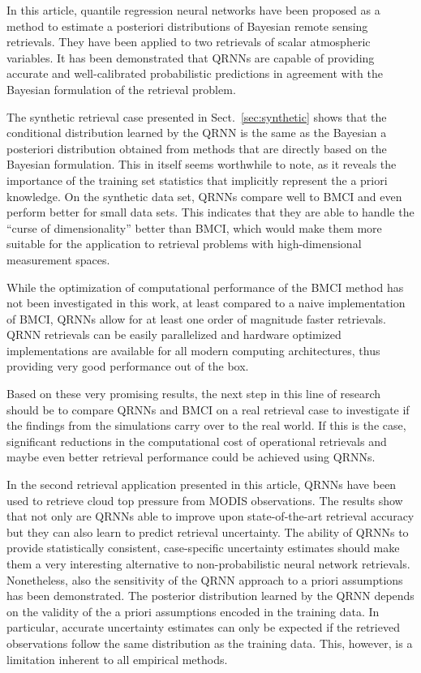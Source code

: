 \documentclass[journal abbreviation, manuscript]{copernicus}
\begin{document}
\conclusions  %
\label{sec:conclusions}

In this article, quantile regression neural networks have been proposed as a
method to estimate a posteriori distributions of Bayesian remote sensing retrievals.
They have been applied to two retrievals of scalar atmospheric variables. It has
been demonstrated that QRNNs are capable of providing accurate and
well-calibrated probabilistic predictions in agreement with the Bayesian
formulation of the retrieval problem.

The synthetic retrieval case presented in Sect.~\ref{sec:synthetic} shows that
the conditional distribution learned by the QRNN is the same as the Bayesian a
posteriori distribution obtained from methods that are directly based on the
Bayesian formulation. This in itself seems worthwhile to note, as it reveals the
importance of the training set statistics that implicitly represent the a priori
knowledge. On the synthetic data set, QRNNs compare well to BMCI and even perform
better for small data sets. This indicates that they are able to handle the
``curse of dimensionality'' \citep{friedman} better than BMCI, which would make them more suitable
for the application to retrieval problems with high-dimensional measurement
spaces.

While the optimization of computational performance of the BMCI method has not been
investigated in this work, at least compared to a naive implementation of BMCI,
QRNNs allow for at least one order of magnitude faster retrievals. QRNN retrievals
can be easily parallelized and hardware optimized implementations are available
for all modern computing architectures, thus providing very good performance out
of the box.

Based on these very promising results, the next step in this line of research
should be to compare QRNNs and BMCI on a real retrieval case to investigate if
the findings from the simulations carry over to the real world. If this is the
case, significant reductions in the computational cost of operational retrievals
and maybe even better retrieval performance could be achieved using QRNNs.

In the second retrieval application presented in this article, QRNNs have been
used to retrieve cloud top pressure from MODIS observations. The results show
that not only are QRNNs able to improve upon state-of-the-art retrieval accuracy
but they can also learn to predict retrieval uncertainty. The ability of QRNNs
to provide statistically consistent, case-specific uncertainty estimates should
make them a very interesting alternative to non-probabilistic neural network
retrievals. Nonetheless, also the sensitivity of the QRNN approach to a priori
assumptions has been demonstrated. The posterior distribution learned by the
QRNN depends on the validity of the a priori assumptions encoded in the training
data. In particular, accurate uncertainty estimates can only be expected if the
retrieved observations follow the same distribution as the training data. This,
however, is a limitation inherent to all empirical methods.
\end{document}
